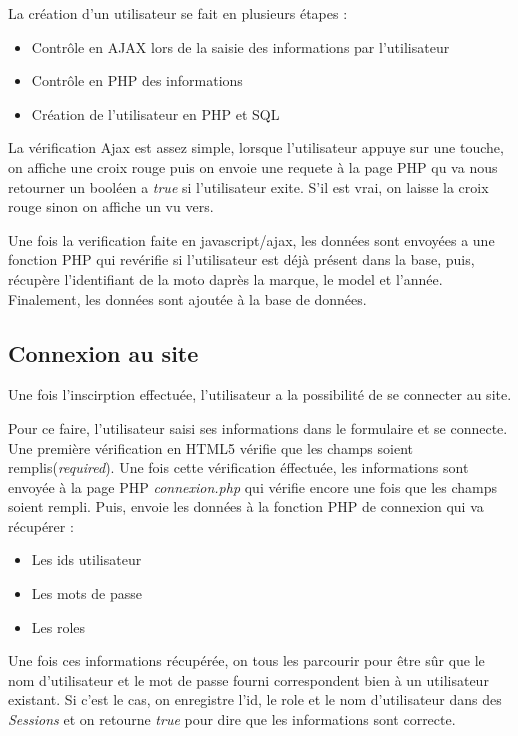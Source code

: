 \documentclass[a4paper]{article}
\begin{document}
La création d'un utilisateur se fait en plusieurs étapes :
\begin{itemize}
    \item Contrôle en AJAX lors de la saisie des informations par l'utilisateur
    \item Contrôle en PHP des informations
    \item Création de l'utilisateur en PHP et SQL
\end{itemize}

La vérification Ajax est assez simple, lorsque l'utilisateur appuye sur une touche, on affiche une croix rouge puis on envoie une requete à la page PHP qu va nous retourner un booléen a \emph{true} si l'utilisateur exite. S'il est vrai, on laisse la croix rouge sinon on affiche un vu vers.


Une fois la verification faite en javascript/ajax, les données sont envoyées a une fonction PHP qui revérifie si l'utilisateur est déjà présent dans la base, puis, récupère l'identifiant de la moto daprès la marque, le model et l'année.
Finalement, les données sont ajoutée à la base de données.



\subsection{Connexion au site}
Une fois l'inscirption effectuée, l'utilisateur a la possibilité de se connecter au site.

Pour ce faire, l'utilisateur saisi ses informations dans le formulaire et se connecte.
Une première vérification en HTML5 vérifie que les champs soient remplis(\emph{required}).
Une fois cette vérification éffectuée, les informations sont envoyée à la page PHP \emph{connexion.php} qui vérifie encore une fois que les champs soient rempli. Puis, envoie les données à la fonction PHP de connexion qui va récupérer :
\begin{itemize}
	\item Les ids utilisateur
	\item Les mots de passe
	\item Les roles
\end{itemize}

Une fois ces informations récupérée, on tous les parcourir pour être sûr que le nom d'utilisateur et le mot de passe fourni correspondent bien à un utilisateur existant.
Si c'est le cas, on enregistre l'id, le role et le nom d'utilisateur dans des \emph{Sessions} et on retourne \emph{true} pour dire que les informations sont correcte.
\end{document}
